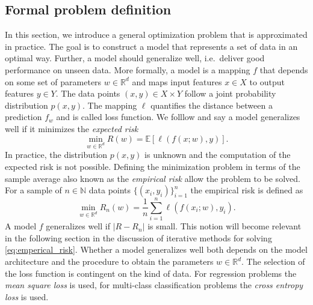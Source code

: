 \documentclass[12pt]{article}
\theoremstyle{definition}
\numberwithin{equation}{section}
\newcommand{\R}{\mathbb{R}}
\newcommand{\ev}[1]{\mathbb{E}\left[{#1}\right]}
\begin{document}
\subsection{Formal problem definition}
In this section, we introduce a general optimization problem that is approximated in practice. The goal is to construct a model that represents a set of data in an optimal way. Further, a model should generalize well, i.e.\ deliver good performance on unseen data. More formally, a model is a mapping $f$ that depends on some set of parameters $w \in \mathbb{R}^d$ and maps input features $x \in X$ to output features $y \in Y$. The data points $(x,y) \in X \times Y$ follow a joint probability distribution $p(x,y)$. The mapping $\ell$ quantifies the distance between a prediction $f_{w}$ and is called loss function. We folllow \cite{bottouOptimizationMethodsLargeScale2018} and say a model generalizes well if it minimizes the \emph{expected risk}
\begin{equation}
  \min_{w \in \mathbb{R}^d} R(w) = \ev{\ell(f(x;w),y)}.
\end{equation}
In practice, the distribution $p(x,y)$ is unknown and the computation of the expected risk is not possible. Defining the minimization problem in terms of the sample average also known as the \emph{empirical risk} allow the problem to be solved. For a sample of $n \in \mathbb{N}$ data points $\{(x_i, y_i)\}_{i=1}^n$ the empirical risk is defined as 
\begin{equation}
  \label{eq:emperical_risk}
  \min_{w \in \mathbb{R}^d}  R_n(w) = \frac{1}{n}\sum_{i=1}^n\ell(f(x_i;w),y_i).
\end{equation}
A model $f$ generalizes well if $|R - R_n|$ is small. This notion will become relevant in the following section in the discussion of iterative methods for solving \eqref{eq:emperical_risk}. Whether a model generalizes well both depends on the model architecture and the procedure to obtain the parameters $w \in \R^d$. 
The selection of the loss function is contingent on the kind of data. For regression problems the \emph{mean square loss} is used, for multi-class classification problems the \emph{cross entropy loss} is used.
\end{document}
